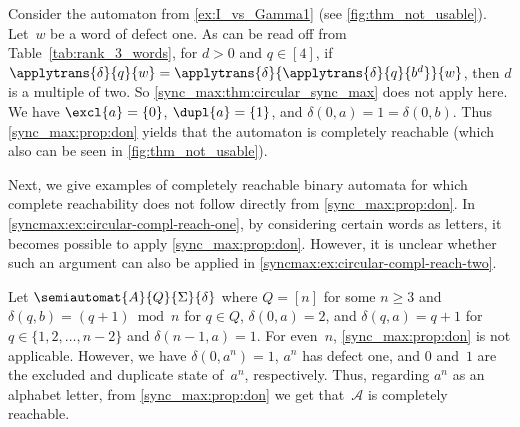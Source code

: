 \begin{example} 
	\label{ex:thm_not_usable}
	Consider the automaton from \cref{ex:I_vs_Gamma1} (see \cref{fig:thm_not_usable}).
	Let~$w$ be a word of defect one. As can be read off
	from  Table~\ref{tab:rank_3_words},
	for $d > 0$ and $q \in [4]$, 
	if 
	$\applytrans{\delta}{q}{w} = \applytrans{\delta}{\applytrans{\delta}{q}{b^d}}{w}$,
	then $d$ is a multiple of two.
	So \cref{sync_max:thm:circular_sync_max}
	does not apply here.
	We have  $\excl{a} = \{0\}$, $\dupl{a} = \{1\}$,
	and $\delta(0, a) = 1 = \delta(0, b)$.
	Thus \cref{sync_max:prop:don} yields that the automaton
	is completely reachable (which also can be seen in \cref{fig:thm_not_usable}).
\end{example}

Next, we give examples of completely reachable binary automata for which complete reachability does not follow directly from \cref{sync_max:prop:don}. In \cref{syncmax:ex:circular-compl-reach-one}, by considering certain words as letters, it becomes possible to apply \cref{sync_max:prop:don}. However, it is unclear whether such an argument can also be applied in \cref{syncmax:ex:circular-compl-reach-two}.

\begin{example} \label{syncmax:ex:circular-compl-reach-one}
	Let $\semiautomat{A}{Q}{\Sigma}{\delta}$
	where $Q = [n]$ for some $n \ge 3$
	and $\delta(q, b) = (q + 1) \bmod n$ for $q \in Q$,
	$\delta(0, a) = 2$, and $\delta(q, a) = q + 1$
	for $q \in \{1,2,\ldots,n-2\}$
	and $\delta(n-1,a) = 1$.
	For even~$n$, \cref{sync_max:prop:don}
	is not applicable.
	However, we have	
	$\delta(0, a^{n}) = 1$,	
	$a^{n}$ has defect one,
	and $0$ and~$1$ are the excluded and duplicate
	state of~$a^{n}$, respectively. Thus, regarding $a^{n}$
	as an alphabet letter, from \cref{sync_max:prop:don}
	we get that~$\mathcal A$ is completely reachable.
\end{example}

